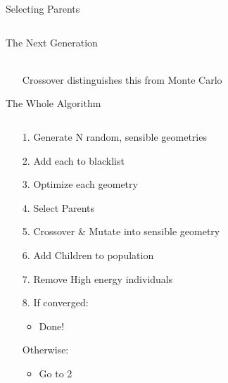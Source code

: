 \documentclass[10pt]{beamer}
\begin{document}
{{\begin{frame}{Selecting Parents}
\begin{columns}[c]
\begin{column}{0.48\textwidth}
		\end{column}	
	\end{columns}
\end{frame}

{%
\begin{frame}{The Next Generation}
	\begin{itemize}[<+->]

		\item[]{~\\Crossover distinguishes this from Monte Carlo}
	\end{itemize}
\end{frame}
}


\begin{frame}{The Whole Algorithm}
	\begin{columns}[c] %
		\begin{column}{.48\textwidth}
			\begin{itemize}[<+->]
				\item[1.] {Generate N random, sensible geometries}
				\item[2.] {Add each to blacklist}
				\item[3.] {Optimize each geometry}
				\item[4.] {Select Parents}
				\item[5.] {Crossover \& Mutate into sensible geometry}
				\item[6.] {Add Children to population}
				\item[7.] {Remove High energy individuals}
				\item[8.] {If converged:}
				\begin{itemize}
					\item{Done!}
				\end{itemize}
				\item[] {Otherwise:}
				\begin{itemize}
					\item{Go to 2}
				\end{itemize}
			\end{itemize}
		\end{column}
		\hfill
		\begin{column}{0.48\textwidth}
			\onslide<11>\begin{itemize}
				\medskip
				\item[]{

}
\end{itemize}
\end{column}
\end{columns}
\end{frame}}}
\end{document}
